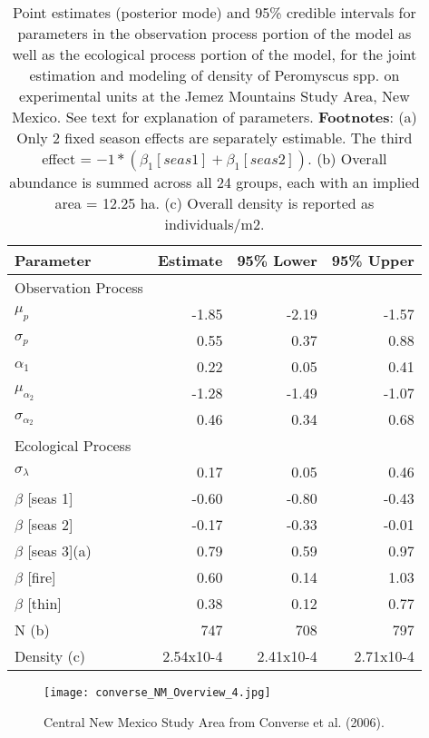 \begin{table}
\centering
\caption{
  Point estimates (posterior mode) and 95\% credible intervals
  for parameters in the observation
  process portion of the model as well
  as the ecological process portion of
  the model, for the joint estimation
  and modeling of density of
  Peromyscus spp. on experimental
  units at the Jemez Mountains Study
  Area, New Mexico.  See text for explanation of parameters. 
  {\bf Footnotes}: 
  (a) Only 2 fixed season effects are separately estimable.  The third
  effect =
  $ -1*(\beta_1 [seas 1]+\beta_1 [seas 2])$.
  (b) Overall abundance is summed across all 24 groups, each with an
  implied 
  area = 12.25 ha.  
  (c) Overall density is reported as individuals/m2.  
}
\begin{tabular}{lrrr}
\hline \hline
Parameter &	Estimate &	95\% Lower &	95\% Upper 
\\ \hline
Observation Process & & & \\ \hline
$\mu_{p}$        &-1.85 & -2.19 &	-1.57 \\
$\sigma_{p}$           &0.55  & 0.37  &	0.88 \\
$\alpha_1$        &0.22  & 0.05  &	0.41 \\
$\mu_{\alpha_{2}}$             &-1.28 & -1.49 &	-1.07 \\
$\sigma_{\alpha_{2}}$     &0.46  & 0.34  &		0.68 \\ \hline \hline
Ecological Process & & & \\
\hline
$\sigma_{\lambda}$      & 0.17 & 0.05  &	0.46 \\
$\beta$ [seas 1]&-0.60 & -0.80 &	-0.43 \\
$\beta$ [seas 2]&-0.17 & -0.33 &	-0.01\\
$\beta$ [seas 3](a)&0.79 & 0.59  &	0.97\\
$\beta$ [fire] &	0.60     & 0.14  &	1.03 \\
$\beta$ [thin] &	0.38     & 0.12  &	0.77 \\
N (b)&	747&	708      & 797 \\
Density (c)&2.54x10-4&2.41x10-4&	2.71x10-4 \\ \hline
\end{tabular}
\end{table}







\clearpage

\begin{figure}
\begin{center}
\texttt{[image: converse\_NM\_Overview\_4.jpg]}
\end{center}
\caption{
Central New Mexico Study Area from Converse et al. (2006).
}
\label{fig.studyarea}
\end{figure}


